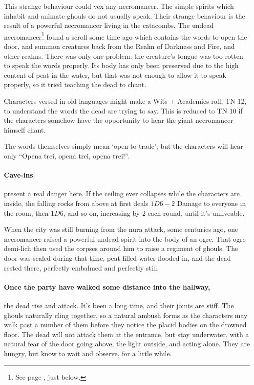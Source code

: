\begin{multicols}{2}
This strange behaviour could vex any necromancer.
The simple spirits which inhabit and animate ghouls do not usually speak.
Their strange behaviour is the result of a powerful necromancer living in the catacombs.
The undead necromancer\footnote{See page \pageref{undead_ogre}, just below.} found a scroll some time ago which contains the words to open the door, and summon creatures back from the Realm of Darkness and Fire, and other realms.
There was only one problem: the creature's tongue was too rotten to speak the words properly.
Its body has only been preserved due to the high content of peat in the water, but that was not enough to allow it to speak properly, so it tried teaching the dead to chant.

Characters versed in old languages might make a Wits + Academics roll, TN 12, to understand the words the dead are trying to say.  This is reduced to TN 10 if the characters somehow have the opportunity to hear the giant necromancer himself chant.

The words themselves simply mean `open to trade', but the characters will hear only ``Opena trei, opena trei, opena trei!''.

\paragraph{Cave-ins} present a real danger here.  If the ceiling ever collapses while the characters are inside, the falling rocks from above at first deals $1D6-2$ Damage to everyone in the room, then $1D6$, and so on, increasing by 2 each round, until it's unliveable.


\begin{exampletext}

When the city was still burning from the nura attack, some centuries ago, one necromancer raised a powerful undead spirit into the body of an ogre.
That ogre demi-lich then used the corpses around him to raise a regiment of ghouls.
The door was sealed during that time, peat-filled water flooded in, and the dead rested there, perfectly embalmed and perfectly still.

\end{exampletext}

\paragraph{Once the party have walked some distance into the hallway,}
the dead rise and attack.
It's been a long time, and their joints are stiff.
The ghouls naturally cling together, so a natural ambush forms as the characters may walk past a number of them before they notice the placid bodies on the drowned floor.
The dead will not attack them at the entrance, but stay underwater, with a natural fear of the door going above, the light outside, and acting alone.
They are hungry, but know to wait and observe, for a little while.


\end{multicols}
